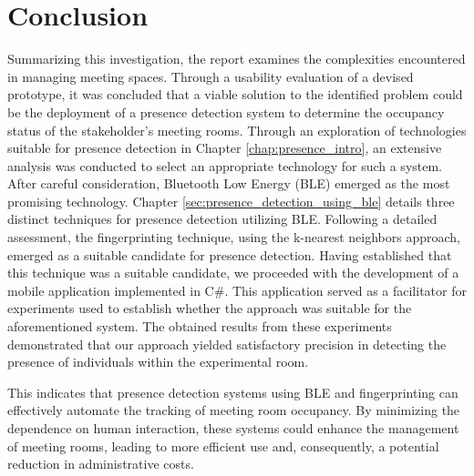 \chapter{Conclusion}
Summarizing this investigation, the report examines the complexities encountered in managing meeting spaces. 
Through a usability evaluation of a devised prototype, it was concluded that a viable solution to the identified problem could be the deployment of a presence detection system to determine the occupancy status of the stakeholder's meeting rooms.
Through an exploration of technologies suitable for presence detection in Chapter \ref{chap:presence_intro}, an extensive analysis was conducted to select an appropriate technology for such a system.
After careful consideration, Bluetooth Low Energy (BLE) emerged as the most promising technology. 
Chapter \ref{sec:presence_detection_using_ble} details three distinct techniques for presence detection utilizing BLE.
Following a detailed assessment, the fingerprinting technique, using the k-nearest neighbors approach, emerged as a suitable candidate for presence detection.
Having established that this technique was a suitable candidate, we proceeded with the development of a mobile application implemented in C#. 
This application served as a facilitator for experiments used to establish whether the approach was suitable for the aforementioned system. 
The obtained results from these experiments demonstrated that our approach yielded satisfactory precision in detecting the presence of individuals within the experimental room.

This indicates that presence detection systems using BLE and fingerprinting can effectively automate the tracking of meeting room occupancy.
By minimizing the dependence on human interaction, these systems could enhance the management of meeting rooms, leading to more efficient use and, consequently, a potential reduction in administrative costs.